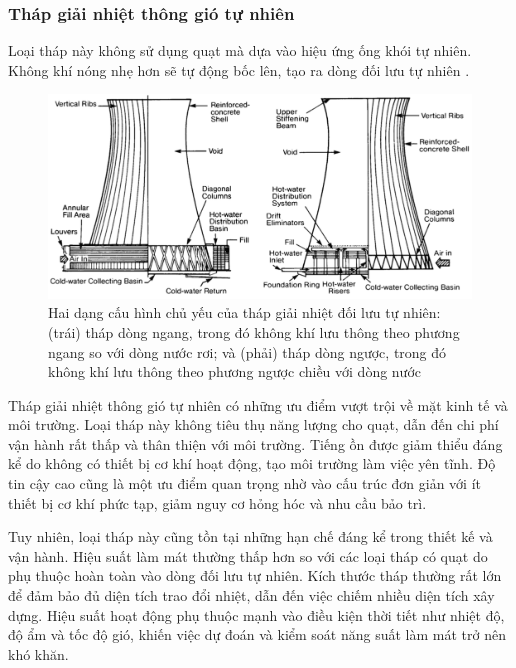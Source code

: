 \documentclass[../main.tex]{subfiles}
\begin{document}
\subsubsection{Tháp giải nhiệt thông gió tự nhiên}
Loại tháp này không sử dụng quạt mà dựa vào hiệu ứng ống khói tự nhiên. Không khí nóng nhẹ hơn sẽ tự động bốc lên, tạo ra dòng đối lưu tự nhiên \cite{patterson_natural_draft_cooling_2013}.

\begin{figure}[H]
    \centering
    \includegraphics[width=1\textwidth]{Hinhve/thap_doi_luu.png}
    \caption{Hai dạng cấu hình chủ yếu của tháp giải nhiệt đối lưu tự nhiên: (trái) tháp dòng ngang, trong đó không khí lưu thông theo phương ngang so với dòng nước rơi; và (phải) tháp dòng ngược, trong đó không khí lưu thông theo phương ngược chiều với dòng nước \cite{unep2006coolingtower_en}}
    \label{fig:thap_doi_luu}
\end{figure}

Tháp giải nhiệt thông gió tự nhiên có những ưu điểm vượt trội về mặt kinh tế và môi trường. Loại tháp này không tiêu thụ năng lượng cho quạt, dẫn đến chi phí vận hành rất thấp và thân thiện với môi trường. Tiếng ồn được giảm thiểu đáng kể do không có thiết bị cơ khí hoạt động, tạo môi trường làm việc yên tĩnh. Độ tin cậy cao cũng là một ưu điểm quan trọng nhờ vào cấu trúc đơn giản với ít thiết bị cơ khí phức tạp, giảm nguy cơ hỏng hóc và nhu cầu bảo trì.

Tuy nhiên, loại tháp này cũng tồn tại những hạn chế đáng kể trong thiết kế và vận hành. Hiệu suất làm mát thường thấp hơn so với các loại tháp có quạt do phụ thuộc hoàn toàn vào dòng đối lưu tự nhiên. Kích thước tháp thường rất lớn để đảm bảo đủ diện tích trao đổi nhiệt, dẫn đến việc chiếm nhiều diện tích xây dựng. Hiệu suất hoạt động phụ thuộc mạnh vào điều kiện thời tiết như nhiệt độ, độ ẩm và tốc độ gió, khiến việc dự đoán và kiểm soát năng suất làm mát trở nên khó khăn.
\end{document}
